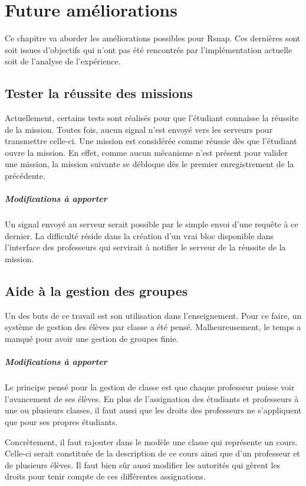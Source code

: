 \chapter{Future améliorations}
Ce chapitre va aborder les améliorations possibles pour Rsnap. Ces dernières sont soit issues d'objectifs qui n'ont pas été rencontrés par l'implémentation actuelle soit de l'analyse de l'expérience.

\section{Tester la réussite des missions}
Actuellement, certains tests sont réalisés pour que l'étudiant connaisse la réussite de la mission. Toutes fois, aucun signal n'est envoyé vers les serveurs pour transmettre celle-ci. Une mission est considérée comme réussie dès que l'étudiant ouvre la mission. En effet, comme aucun mécanisme n'est présent pour valider une mission, la mission suivante se débloque dès le premier enregistrement de la précédente.

\paragraph{Modifications à apporter}
Un signal envoyé au serveur serait possible par le simple envoi d'une requête à ce dernier. La difficulté réside dans la création d'un vrai bloc disponible dans l'interface des professeurs qui servirait à notifier le serveur de la réussite de la mission.

\section{Aide à la gestion des groupes}
Un des buts de ce travail est son utilisation dans l'enseignement. Pour ce faire, un système de gestion des élèves par classe a été pensé. Malheureusement, le temps a manqué pour avoir une gestion de groupes finie. 

\paragraph{Modifications à apporter}
Le principe pensé pour la gestion de classe est que chaque professeur puisse voir l'avancement de ses élèves. En plus de l'assignation des étudiants et professeurs à une ou plusieurs classes, il faut aussi que les droits des professeurs ne s'appliquent que pour ses propres étudiants. 

Concrètement, il faut rajouter dans le modèle une classe qui représente un cours. Celle-ci serait constituée de la description de ce cours ainsi que d'un professeur et de plusieurs élèves. Il faut bien sûr aussi modifier les autorités qui gèrent les droits pour tenir compte de ces différentes assignations.

